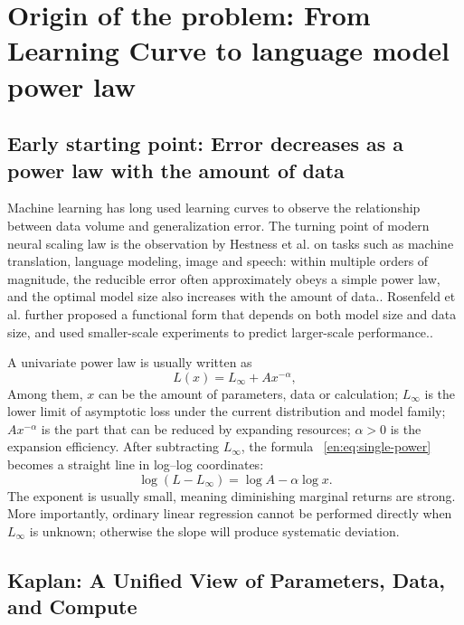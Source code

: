 \documentclass[UTF8,10pt,a4paper,fontset=none]{ctexart}
\begin{document}
\section{Origin of the problem: From Learning Curve to language model power law}

\subsection{Early starting point: Error decreases as a power law with the amount of data}

Machine learning has long used learning curves to observe the relationship between data volume and generalization error. The turning point of modern neural scaling law is the observation by Hestness et al. on tasks such as machine translation, language modeling, image and speech: within multiple orders of magnitude, the reducible error often approximately obeys a simple power law, and the optimal model size also increases with the amount of data.\cite{en:hestness2017}. Rosenfeld et al. further proposed a functional form that depends on both model size and data size, and used smaller-scale experiments to predict larger-scale performance.\cite{en:rosenfeld2019}.

A univariate power law is usually written as
\begin{equation}
  L(x)=L_{\infty}+A x^{-\alpha},
  \label{en:eq:single-power}
\end{equation}
Among them, $x$ can be the amount of parameters, data or calculation; $L_{\infty}$ is the lower limit of asymptotic loss under the current distribution and model family; $A x^{-\alpha}$ is the part that can be reduced by expanding resources; $\alpha>0$ is the expansion efficiency. After subtracting $L_{\infty}$, the formula ~\eqref{en:eq:single-power} becomes a straight line in log--log coordinates:
\begin{equation}
  \log\!\left(L-L_{\infty}\right)=\log A-\alpha\log x.
  \label{en:eq:loglinear}
\end{equation}
The exponent is usually small, meaning diminishing marginal returns are strong. More importantly, ordinary linear regression cannot be performed directly when $L_{\infty}$ is unknown; otherwise the slope will produce systematic deviation.

\subsection{Kaplan: A Unified View of Parameters, Data, and Compute}
\end{document}
